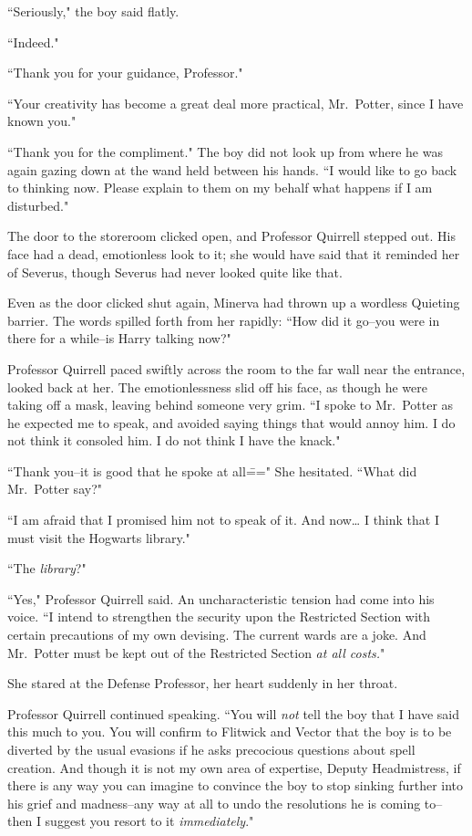 ``Seriously," the boy said flatly.

``Indeed."

``Thank you for your guidance, Professor."

``Your creativity has become a great deal more practical, Mr.~Potter, since I have known you."

``Thank you for the compliment." The boy did not look up from where he was again gazing down at the wand held between his hands. ``I would like to go back to thinking now. Please explain to them on my behalf what happens if I am disturbed."

\later

The door to the storeroom clicked open, and Professor Quirrell stepped out. His face had a dead, emotionless look to it; she would have said that it reminded her of Severus, though Severus had never looked quite like that.

Even as the door clicked shut again, Minerva had thrown up a wordless Quieting barrier. The words spilled forth from her rapidly: ``How did it go\---you were in there for a while\---is Harry talking now?"

Professor Quirrell paced swiftly across the room to the far wall near the entrance, looked back at her. The emotionlessness slid off his face, as though he were taking off a mask, leaving behind someone very grim. ``I spoke to Mr.~Potter as he expected me to speak, and avoided saying things that would annoy him. I do not think it consoled him. I do not think I have the knack."

``Thank you\---it is good that he spoke at all\===" She hesitated. ``What did Mr.~Potter say?"

``I am afraid that I promised him not to speak of it. And now{\ldots} I think that I must visit the Hogwarts library."

``The \emph{library}?"

``Yes," Professor Quirrell said. An uncharacteristic tension had come into his voice. ``I intend to strengthen the security upon the Restricted Section with certain precautions of my own devising. The current wards are a joke. And Mr.~Potter must be kept out of the Restricted Section \emph{at all costs.}"

She stared at the Defense Professor, her heart suddenly in her throat.

Professor Quirrell continued speaking. ``You will \emph{not} tell the boy that I have said this much to you. You will confirm to Flitwick and Vector that the boy is to be diverted by the usual evasions if he asks precocious questions about spell creation. And though it is not my own area of expertise, Deputy Headmistress, if there is any way you can imagine to convince the boy to stop sinking further into his grief and madness\---any way at all to undo the resolutions he is coming to\---then I suggest you resort to it \emph{immediately}."
